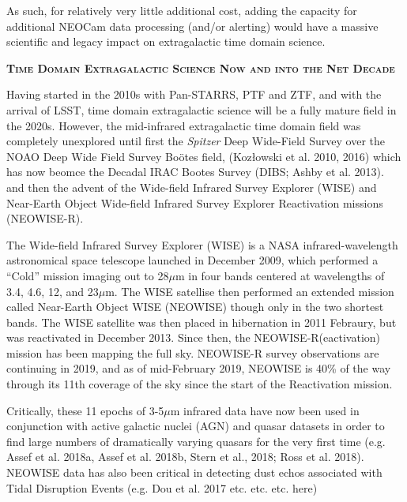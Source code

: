 \documentclass[12pt]{article}
\begin{document}
As such, for relatively very little additional cost, adding the
capacity for additional NEOCam data processing (and/or alerting) would
have a massive scientific and legacy impact on extragalactic time
domain science.


\pagebreak

\smallskip
\smallskip
\noindent
{\bfseries \textsc{\textcolor{Cerulean}{Time Domain Extragalactic Science Now and into the Net Decade}}}

\smallskip
\noindent
Having started in the 2010s with Pan-STARRS, PTF and ZTF, and with the
arrival of LSST, time domain extragalactic science will be a fully
mature field in the 2020s. However, the mid-infrared extragalactic time domain 
field was completely unexplored until first the {\it Spitzer}
Deep Wide-Field Survey over the NOAO Deep Wide Field Survey Bo\"{o}tes
field, (Koz{\l}owski et al. 2010, 2016) which has now beomce the 
Decadal IRAC Bootes Survey (DIBS; Ashby et al. 2013). 
and then the advent of the Wide-field Infrared
Survey Explorer (WISE) and Near-Earth Object Wide-field Infrared
Survey Explorer Reactivation missions (NEOWISE-R). 

\smallskip
\noindent
The Wide-field Infrared Survey Explorer (WISE) is a NASA
infrared-wavelength astronomical space telescope launched in December
2009, which performed a ``Cold'' mission imaging out to 28$\mu$m 
in four bands centered at wavelengths of 3.4, 4.6, 12, and 23$\mu$m.  
The WISE satellise then performed an extended mission called Near-Earth Object WISE
(NEOWISE) though only in the two shortest bands. The WISE satellite was then placed in hibernation in 2011
Febraury, but was reactivated in December 2013.  Since then, the
NEOWISE-R(eactivation) mission has been mapping the full sky.
NEOWISE-R survey observations are continuing in 2019, and as of
mid-February 2019, NEOWISE is 40\% of the way through its 11th
coverage of the sky since the start of the Reactivation mission.

\smallskip
\noindent
Critically, these 11 epochs of 3-5$\mu$m infrared data have now been
used in conjunction with active galactic nuclei (AGN) and quasar datasets in order to find
large numbers of dramatically varying quasars for the very first time
(e.g. Assef et al. 2018a, Assef et al. 2018b, Stern et al., 2018; Ross et al. 2018).
NEOWISE data has also been critical in detecting dust echos associated 
with Tidal Disruption Events 
(e.g. Dou et al. 2017 etc. etc. etc. here)
\end{document}

